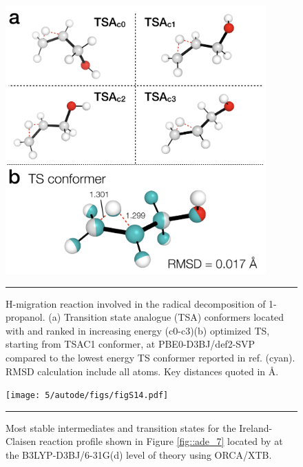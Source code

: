\documentclass[../../main.tex]{subfiles}
\begin{document}
\begin{figure}[h!]
	\vspace{0.4cm}
	\centering
	\includegraphics[width=10cm]{5/autode/figs/figS13}
	\vspace{0.4cm}
	\hrule
	\caption{H-migration reaction involved in the radical decomposition of 1-propanol. (a) Transition state analogue (TSA) conformers located with \ade and ranked in increasing energy (c0-c3)(b) optimized TS, starting from TSAC1 conformer, at PBE0-D3BJ/def2-SVP compared to the lowest energy TS conformer reported in ref. \cite{Ferro-Costas2018} (cyan). RMSD calculation include all atoms. Key distances quoted in \AA.}
	\label{fig::ade_si_13}
\end{figure}



\begin{figure}[h!]
	\vspace{0.4cm}
	\centering
	\texttt{[image: 5/autode/figs/figS14.pdf]}
	\vspace{0.4cm}
	\hrule
	\caption{Most stable intermediates and transition states for the Ireland-Claisen reaction profile shown in Figure \ref{fig::ade_7} located by \ade at the B3LYP-D3BJ/6-31G(d) level of theory using ORCA/XTB. }
	\label{fig::ade_si_14}
\end{figure}
\end{document}
